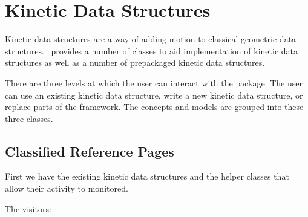 \chapter{Kinetic Data Structures}
\label{ref-chapter-kds}


Kinetic data structures are a way of adding motion to classical
geometric data structures. \cgal\ provides a number of classes to aid
implementation of kinetic data structures as well as a number of
prepackaged kinetic data structures.

There are three levels at which the user can interact with the
package. The user can use an existing kinetic data structure, write a
new kinetic data structure, or replace parts of the framework. The
concepts and models are grouped into these three classes.


\section{Classified Reference Pages}


First we have the existing kinetic data structures and the helper
classes that allow their activity to monitored.






 
The visitors:







